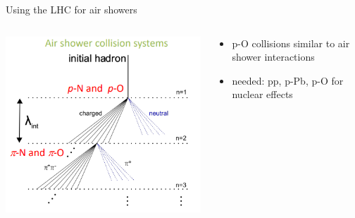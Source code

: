 \documentclass[aspectratio=1610, 9pt]{beamer}
\begin{document}
\begin{frame}{Using the LHC for air showers}
  \begin{columns}
    \begin{column}[c]{0.48\textwidth}
      \includegraphics[width=\textwidth]{lhc_shower.png}
    \end{column}
    \begin{column}[c]{0.48\textwidth}
      \begin{itemize}
        \item p-O collisions similar to air shower interactions
        \item needed: pp, p-Pb, p-O for nuclear effects
      \end{itemize}
    \end{column}
  \end{columns}
\end{frame}
\end{document}

